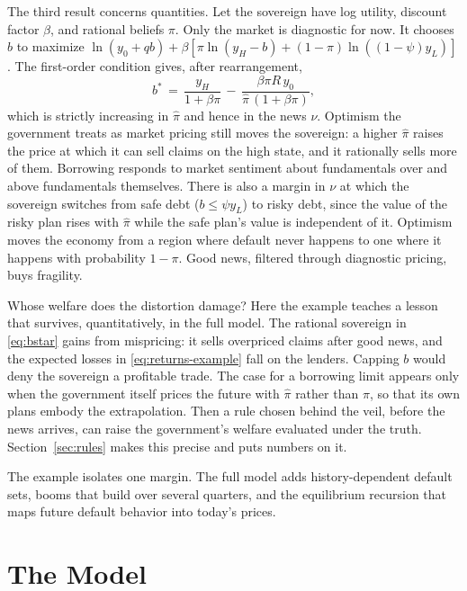 \documentclass[11pt]{article}
\theoremstyle{definition}
\begin{document}
The third result concerns quantities. Let the sovereign have log utility, discount factor $\beta$, and rational beliefs $\pi$. Only the market is diagnostic for now. It chooses $b$ to maximize $\ln(y_0 + qb) + \beta[\pi \ln(y_H - b) + (1-\pi)\ln((1-\psi)y_L)]$. The first-order condition gives, after rearrangement,
\begin{equation}
b^{*} \,=\, \frac{y_H}{1+\beta\pi} \,-\, \frac{\beta\pi R\, y_0}{\hat\pi\,(1+\beta\pi)},
\label{eq:bstar}
\end{equation}
which is strictly increasing in $\hat\pi$ and hence in the news $\nu$. Optimism the government treats as market pricing still moves the sovereign: a higher $\hat\pi$ raises the price at which it can sell claims on the high state, and it rationally sells more of them. Borrowing responds to market sentiment about fundamentals over and above fundamentals themselves. There is also a margin in $\nu$ at which the sovereign switches from safe debt ($b \leq \psi y_L$) to risky debt, since the value of the risky plan rises with $\hat\pi$ while the safe plan's value is independent of it. Optimism moves the economy from a region where default never happens to one where it happens with probability $1-\pi$. Good news, filtered through diagnostic pricing, buys fragility.

Whose welfare does the distortion damage? Here the example teaches a lesson that survives, quantitatively, in the full model. The rational sovereign in \eqref{eq:bstar} gains from mispricing: it sells overpriced claims after good news, and the expected losses in \eqref{eq:returns-example} fall on the lenders. Capping $b$ would deny the sovereign a profitable trade. The case for a borrowing limit appears only when the government itself prices the future with $\hat\pi$ rather than $\pi$, so that its own plans embody the extrapolation. Then a rule chosen behind the veil, before the news arrives, can raise the government's welfare evaluated under the truth. Section~\ref{sec:rules} makes this precise and puts numbers on it.

The example isolates one margin. The full model adds history-dependent default sets, booms that build over several quarters, and the equilibrium recursion that maps future default behavior into today's prices.

\section{The Model}\label{sec:model}
\end{document}
